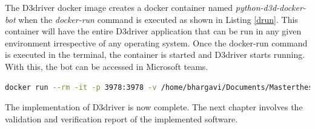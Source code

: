 The D3driver docker image creates a docker container named \textit{python-d3d-docker-bot} when the \textit{docker-run} command is executed as shown in Listing \ref{drun}. This container will have the entire D3driver application that can be run in any given environment irrespective of any operating system. Once the docker-run command is executed in the terminal, the container is started and D3driver starts running. With this, the bot can be accessed in Microsoft teams. 

\begin{lstlisting}[caption={Docker run command},label={drun},language=bash]
docker run --rm -it -p 3978:3978 -v /home/bhargavi/Documents/Masterthesis_bot2021/src/database:"/app/database" python-d3d-docker-bot
\end{lstlisting}
	
 
The implementation of D3driver is now complete. The next chapter involves the validation and verification report of the implemented software.